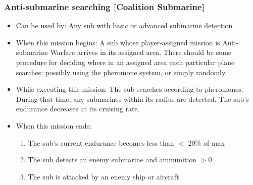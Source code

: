 \documentclass{article}
\begin{document}
    \subsubsection{Anti-submarine searching [Coalition Submarine]}
        \begin{itemize}
            \item Can be used by: Any sub with basic or advanced submarine detection
            \item When this mission begins: A sub whose player-assigned mission is Anti-submarine Warfare arrives in its assigned area. There should be some procedure for deciding where in an assigned area each particular plane searches; possibly using the pheromone system, or simply randomly.
            \item While executing this mission: The sub searches according to pheromones. During that time, any submarines within its radius are detected. The sub's endurance decreases at its cruising rate.
            \item When this mission ends:
                \begin{enumerate}[label=\arabic*)]
                    \item The sub's current endurance becomes less than $<$ 20\% of max  \par
                    [Sub mission becomes Transit to Base]
                    \item The sub detects an enemy submarine and ammunition $>0$\par
                    [Sub mission becomes Attacking Submarine]
                    \item The sub is attacked by an enemy ship or aircraft \par
                    [Sub mission becomes Transit to Base]
                \end{enumerate}
        \end{itemize}
\end{document}
